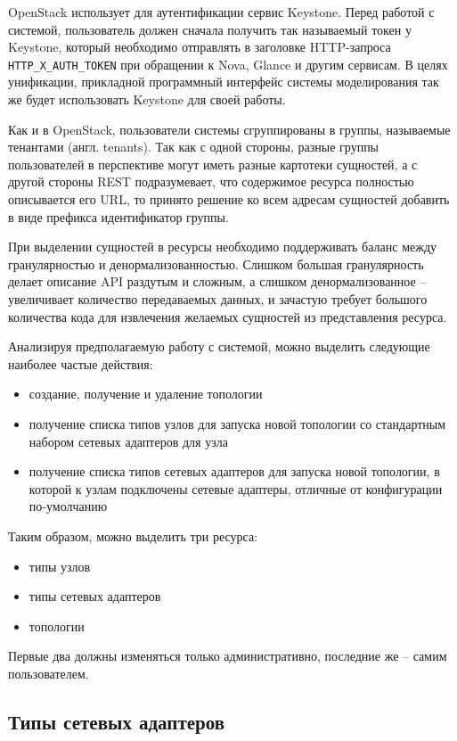 OpenStack использует для аутентификации сервис Keystone. Перед работой с системой, пользователь
должен сначала получить так называемый токен у Keystone, который необходимо отправлять в 
заголовке HTTP-запроса \verb`HTTP_X_AUTH_TOKEN` при обращении к Nova, Glance и другим сервисам. 
В целях унификации, прикладной программный интерфейс системы моделирования так же будет 
использовать Keystone для своей работы.

Как и в OpenStack, пользователи системы сгруппированы в группы, называемые тенантами 
(англ. tenants). Так как с одной стороны, разные группы пользователей в перспективе могут иметь 
разные картотеки сущностей, а с другой стороны REST подразумевает, что содержимое 
ресурса полностью описывается его URL, то принято решение ко всем адресам сущностей добавить
в виде префикса идентификатор группы.

При выделении сущностей в ресурсы необходимо поддерживать баланс между гранулярностью
и денормализованностью. Слишком большая гранулярность делает описание API раздутым и сложным,
а слишком денормализованное -- увеличивает количество передаваемых данных, и зачастую 
требует большого количества кода для извлечения желаемых сущностей из представления ресурса.

Анализируя предполагаемую работу с системой, можно выделить следующие наиболее частые действия:
\begin{itemize}
   \item создание, получение и удаление топологии
   \item получение списка типов узлов для запуска новой топологии со стандартным 
            набором сетевых адаптеров для узла
   \item получение списка типов сетевых адаптеров для запуска новой топологии, в которой
            к узлам подключены сетевые адаптеры, отличные от конфигурации по-умолчанию
\end{itemize}

Таким образом, можно выделить три ресурса:
\begin{itemize}
    \item типы узлов
    \item типы сетевых адаптеров
    \item топологии
\end{itemize}
Первые два должны изменяться только административно, последние же -- самим пользователем.

\subsection{Типы сетевых адаптеров}

